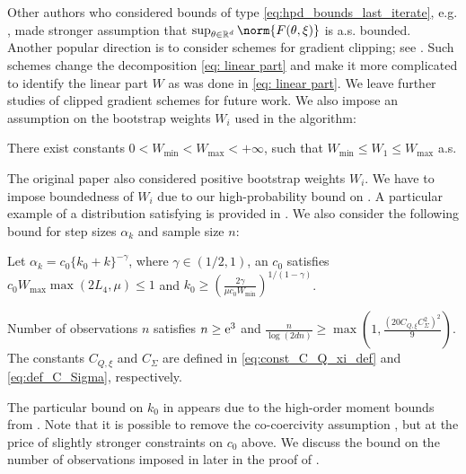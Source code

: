 \par 
Other authors who considered bounds of type \eqref{eq:hpd_bounds_last_iterate}, e.g. \cite{rakhlin2012making}, made stronger assumption that $\sup_{\theta \in \rset^{d}}\norm{F(\theta,\xi)}$ is a.s. bounded. Another popular direction is to consider schemes for gradient clipping; see \cite{sadiev2023high}. Such schemes change the decomposition \eqref{eq: linear part} and make it more complicated to identify the linear part $W$ as was done in \eqref{eq: linear part}. We leave further studies of clipped gradient schemes for future work. We also impose an assumption on the bootstrap weights $W_i$ used in the algorithm:
\begin{assum}
\label{ass:bound_bootstap_weights}
There exist constants $0 < W_{\min} < W_{\max} < +\infty$, such that $W_{\min}\leq W_1\leq  W_{\max}$ a.s.
\end{assum}
The original paper \cite{JMLR:v19:17-370} also considered positive bootstrap weights $W_i$. We have to impose boundedness of $W_i$ due to our high-probability bound on . A particular example of a distribution satisfying  is provided in . We also consider the following bound for step sizes $\alpha_k$ and sample size $n$:
\begin{assum}
\label{ass:step_size_new_boot} Let $\alpha_k = c_0 \{k_0 +k\}^{-\gamma}$, where $\gamma \in (1/2, 1)$, an $c_0$ satisfies $c_0 W_{\max} \max(2L_4, \mu) \leq 1$ and $k_0 \geq(\frac{2\gamma}{\mu c_0 W_{\min}})^{1/(1-\gamma)}$.
\end{assum} 
\begin{assum}
\label{ass:n_lower_bound}
Number of observations $n$ satisfies $n \geq \mathrm{e}^3$ and $\frac{n}{\log(2dn)}\geq \max(1, \frac{(20 C_{Q, \xi}C_{\Sigma}^2)^2}{9})$. The constants $C_{Q, \xi}$ and $C_\Sigma$ are defined in \eqref{eq:const_C_Q_xi_def} and \eqref{eq:def_C_Sigma}, respectively.
\end{assum}
The particular bound on $k_0$ in  appears due to the high-order moment bounds from . Note that it is possible to remove the co-coercivity assumption , but at the price of slightly stronger constraints on $c_0$ above. We discuss the bound on the number of observations imposed in  later in the proof of . 

